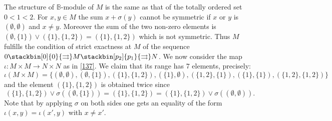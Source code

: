 \documentclass[12pt]{article}
\def\B{{\mathbb B}}
\def\strg{strict }
\begin{document}
 \proof 
The structure of $\B$-module of $M$ is the same as that of the totally ordered set $0<1<2$. For $x,y\in M$ the sum $x+\sigma(y)$ cannot be symmetric if $x$ or $y$ is $(\emptyset,\emptyset)$ and $x\neq y$. Moreover the sum of the two non-zero elements is $(\emptyset,\{1\})\vee (\{1\},\{1,2\})=(\{1\},\{1,2\})$ which is not symmetric. Thus $M$ fulfills the condition of \strg exactness at $M$ of the sequence $0 \stackbin[0]{0}{\rightrightarrows}M\stackbin[p_2]{p_1}{\rightrightarrows}N$. We now consider the map $\iota:M\times M\to N\times N$ as in \eqref{137}. We claim that its range has $7$ elements, precisely:
$$
\iota(M\times M)=\{(\emptyset,\emptyset), (\emptyset,\{1\}),(\{1\},\{1,2\}),(\{1\},\emptyset),(\{1,2\},\{1\}),(\{1\},\{1\}),(\{1,2\},\{1,2\})\}
$$
and the element $(\{1\},\{1,2\})$ is obtained twice since 
$$
(\{1\},\{1,2\})\vee \sigma((\emptyset,\{1\}))=(\{1\},\{1,2\})=(\{1\},\{1,2\})\vee \sigma((\emptyset,\emptyset)).
$$
Note that by applying $\sigma$ on both sides one gets an equality of the form $\iota(x,y)=\iota(x',y)$ with $x\neq x'$.\endproof 
\end{document}
